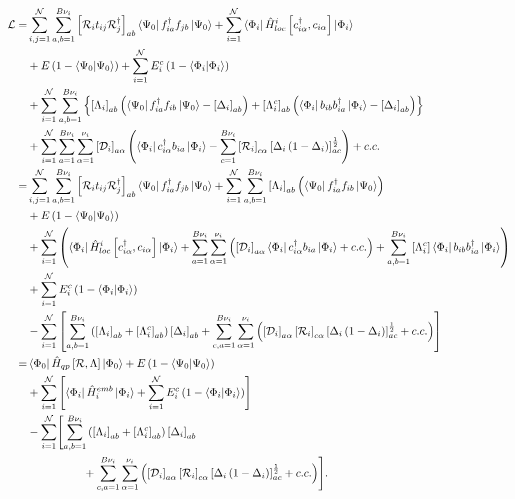 \begin{align}
    \mathcal{L}=&\sum_{i,j=1}^{\mathcal{N}}\sum_{a,b=1}^{B\nu_{i}}\left[ \mathcal{R} _{i}t_{ij}\mathcal{R}^\dagger_{j} \right]_{ab}\bra{\Psi_{0}}f^\dagger_{ia}f_{jb}\ket{\Psi_{0}}+\sum_{i=1}^{\mathcal{N}}\Bra{\Phi_{i}}\hat{H}^{i}_{loc}\left[ c^\dagger_{i\alpha},c_{i\alpha} \right]\ket{\Phi_{i}} \notag \\
    &+E\left( 1-\braket{\Psi_{0}} \right)+\sum_{i=1}^{\mathcal{N}}E_{i}^{c}\left( 1-\braket{\Phi_{i}} \right) \notag \\
    &+\sum_{i=1}^{\mathcal{N}}\sum_{a,b=1}^{B\nu_{i}}\left \{ \left[ \Lambda_{i} \right]_{ab}\left( \bra{\Psi_{0}}f^\dagger_{ia}f_{ib}\ket{\Psi_{0}}-\left[ \Delta_{i} \right]_{ab} \right)+\left[ \Lambda^{c}_{i} \right]_{ab}\left( \Bra{\Phi_{i}}b_{ib}b^\dagger_{ia}\ket{\Phi_{i}}-\left[ \Delta_{i} \right]_{ab} \right) \right\} \notag \\
    &+\sum_{i=1}^{\mathcal{N}}\sum_{a=1}^{B\nu_{i}}\sum_{\alpha=1}^{\nu_{i}}\left[ \mathcal{D}_{i} \right]_{a\alpha}\left( \Bra{\Phi_{i}}c^\dagger_{i\alpha}b_{ia}\ket{\Phi_{i}}-\sum_{c=1}^{B{\nu_{i}}}\left[ \mathcal{R}_{i} \right]_{c\alpha}\left[ \Delta_{i}\left( 1-\Delta_{i} \right) \right]_{ac}^{\frac{1}{2}} \right)+c.c. \notag \\
    =&\sum_{i,j=1}^{\mathcal{N}}\sum_{a,b=1}^{B\nu_{i}}\left[ \mathcal{R}_{i}t_{ij}\mathcal{R}^\dagger_{j} \right]_{ab}\bra{\Psi_{0}}f^\dagger_{ia}f_{jb}\ket{\Psi_{0}}+\sum_{i=1}^{\mathcal{N}}\sum_{a,b=1}^{B\nu_{i}}\left[ \Lambda_{i} \right]_{ab}\left( \bra{\Psi_{0}}f^\dagger_{ia}f_{ib}\ket{\Psi_{0}} \right) \notag \\
    &+E\left( 1-\braket{\Psi_{0}} \right) \notag \\
    &+\sum_{i=1}^{\mathcal{N}}\left( \bra{\Phi_{i}}\hat{H}^{i}_{loc}\left[ c^\dagger_{i\alpha},c_{i\alpha} \right]\ket{\Phi_{i}}+\sum_{a=1}^{B\nu_{i}}\sum_{\alpha=1}^{\nu_{i}}\left( \left[ \mathcal{D}_{i} \right]_{a\alpha}\bra{\Phi_{i}}c^\dagger_{i\alpha}b_{ia}\ket{\Phi_{i}}+c.c. \right)+\sum_{a,b=1}^{B\nu_{i}}\left[ \Lambda_{i}^{c} \right]\bra{\Phi_{i}}b_{ib}b^\dagger_{ia}\ket{\Phi_{i}} \right) \notag \\
    &+\sum_{i=1}^{\mathcal{N}}E_{i}^{c}\left( 1-\braket{\Phi_{i}} \right) \notag \\
    &-\sum_{i=1}^{\mathcal{N}}\left[ \sum_{a,b=1}^{B\nu_{i}}\left( \left[ \Lambda_{i} \right]_{ab}+\left[ \Lambda_{i}^{c} \right]_{ab} \right)\left[ \Delta_{i} \right]_{ab}+\sum_{c,a=1}^{B\nu_{i}}\sum_{\alpha=1}^{\nu_{i}}\left( \left[ \mathcal{D}_{i} \right]_{a\alpha}\left[ \mathcal{R}_{i} \right]_{c\alpha}\left[ \Delta_{i}\left( 1-\Delta_{i} \right) \right]_{ac}^{\frac{1}{2}}+c.c. \right) \right] \notag \\
    =&\bra{\Phi_{0}}\hat{H}_{qp}\left[ \mathcal{R},\Lambda \right]\ket{\Phi_{0}}+E\left( 1-\braket{\Psi_{0}} \right) \notag \\
    &+\sum_{i=1}^{\mathcal{N}}\left[ \bra{\Phi_{i}}\hat{H}^{emb}_{i}\ket{\Phi_{i}}+\sum_{i=1}^{\mathcal{N}}E_{i}^{c}\left( 1-\braket{\Phi_{i}} \right) \right] \notag \\
    &-\sum_{i=1}^{\mathcal{N}}\Biggl[ \sum_{a,b=1}^{B\nu_{i}}\left( \left[ \Lambda_{i} \right]_{ab}+\left[ \Lambda_{i}^{c} \right]_{ab} \right)\left[ \Delta_{i} \right]_{ab} \notag \\
    &\qquad\qquad\quad +\sum_{c,a=1}^{B\nu_{i}}\sum_{\alpha=1}^{\nu_{i}}\left( \left[ \mathcal{D}_{i} \right]_{a\alpha}\left[ \mathcal{R}_{i} \right]_{c\alpha}\left[ \Delta_{i}\left( 1-\Delta_{i} \right) \right]_{ac}^{\frac{1}{2}}+c.c. \right) \Biggr].
\end{align}


